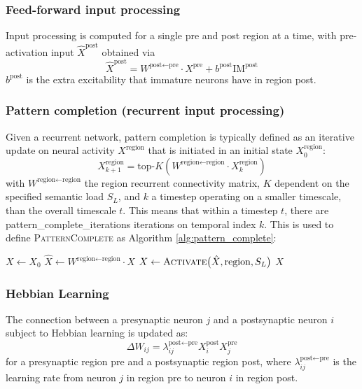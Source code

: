 \documentclass{article}
\begin{document}
\subsubsection*{Feed-forward input processing}
Input processing is computed for a single pre and post region at a time, with pre-activation input $\hat{X}^\textrm{post}$ obtained via
\begin{equation}
    \hat{X}^\textrm{post} = W^{\textrm{post}\leftarrow\textrm{pre}} \cdot X^\textrm{pre} + b^\textrm{post}\textrm{IM}^\textrm{post}
\end{equation}
$b^\textrm{post}$ is the extra excitability that immature neurons have in region post.
\subsubsection*{Pattern completion (recurrent input processing)}
Given a recurrent network, pattern completion is typically defined as an iterative update on neural activity $X^\textrm{region}$ that is initiated in an initial state $X^\textrm{region}_0$:
\begin{equation}
    X^{\textrm{region}}_{k+1} = \textrm{top-}K(W^{\textrm{region}\leftarrow\textrm{region}}\cdot X^\textrm{region}_{k})
\end{equation}
with $W^{\textrm{region}\leftarrow\textrm{region}}$ the region recurrent connectivity matrix, $K$ dependent on the specified semantic load $S_L$, and $k$ a timestep operating on a smaller timescale,  than the overall timescale $t$. This means that within a timestep $t$, there are pattern\_complete\_iterations iterations on temporal index $k$. This is used to define \textsc{PatternComplete}  as Algorithm \ref{alg:pattern_complete}:
\begin{algorithm}[h!]
\caption{Pattern Completion}\label{alg:pattern_complete}
\begin{algorithmic}[1]
    \State $X \gets X_0$
        \State $\hat{X} \gets W^{\textrm{region} \leftarrow \textrm{region}} \cdot X$
    \State $X \gets \textsc{Activate}\bigl(\hat{X}, \textrm{region}, S_L \bigr)$
    \EndFor
    \State \Return $X$
\EndFunction
\end{algorithmic}
\end{algorithm}
\subsubsection*{Hebbian Learning}
The connection between a presynaptic neuron $j$ and a postsynaptic neuron $i$ subject to Hebbian learning is updated as:
\begin{equation}
            \Delta W_{ij} = \lambda_{ij}^{\textrm{post} \leftarrow \textrm{pre}}
            X_i^\textrm{post} X_j^\textrm{pre}
\end{equation}
for a presynaptic region pre and a postsynaptic region post, where $\lambda_{ij}^{\textrm{post} \leftarrow \textrm{pre}}$ is the learning rate from neuron $j$ in region pre to neuron $i$ in region post.
\end{document}
